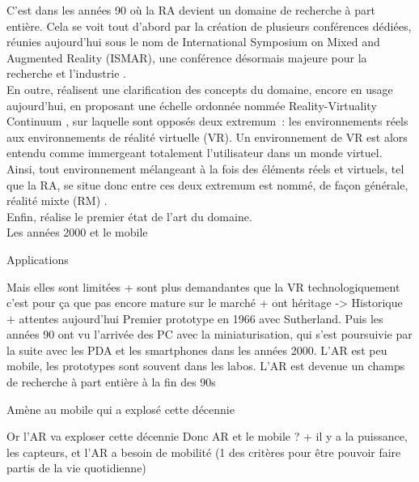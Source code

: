 C'est dans les années 90 où la RA devient un domaine de recherche à part entière. Cela se voit tout d'abord par la création de plusieurs conférences dédiées, réunies aujourd'hui sous le nom de International Symposium on Mixed and Augmented Reality (ISMAR), une conférence désormais majeure pour la recherche et l'industrie \citep{VanKrevelenPoelman2010}.\\
En outre, \citet{MilgramKishino1994} réalisent une clarification des concepts du domaine, encore en usage aujourd'hui, en proposant une échelle ordonnée nommée \foreignlanguage{english}{Reality-Virtuality Continuum} , sur laquelle sont opposés deux extremum~: les environnements réels aux environnements de réalité virtuelle (VR). Un environnement de VR est alors entendu comme immergeant totalement l'utilisateur dans un monde virtuel. Ainsi, tout environnement mélangeant à la fois des éléments réels et virtuels, tel que la RA, se situe donc entre ces deux extremum est nommé, de façon générale, réalité mixte (RM) \citep{MilgramKishino1994}.\\
Enfin, \citet{Azuma1997} réalise le premier état de l'art du domaine.\\

Les années 2000 et le mobile


Applications \citep{VanKrevelenPoelman2010} \citet{CarmignianiFurhtAnisettiEtAl2011}

Mais elles sont limitées + sont plus demandantes que la VR technologiquement c'est pour ça que pas encore mature sur le marché + ont héritage -> Historique + attentes aujourd'hui
Premier prototype en 1966 avec Sutherland. Puis les années 90 ont vu l'arrivée des PC avec la miniaturisation, qui s'est poursuivie par la suite avec les PDA et les smartphones dans les années 2000. L'AR est peu mobile, les prototypes sont souvent dans les labos. L'AR est devenue un champs de recherche à part entière à la fin des 90s

Amène au mobile qui a explosé cette décennie

Or l'AR va exploser cette décennie
Donc AR et le mobile ? + il y a la puissance, les capteurs, et l'AR a besoin de mobilité (1 des critères pour être pouvoir faire partis de la vie quotidienne) \citep{VanKrevelenPoelman2010}


